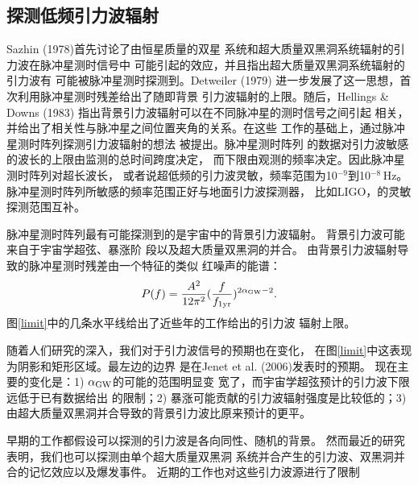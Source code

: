 \subsection{探测低频引力波辐射}

Sazhin (1978)\supercite{saz78}首先讨论了由恒星质量的双星
系统和超大质量双黑洞系统辐射的引力波在脉冲星测时信号中
可能引起的效应，并且指出超大质量双黑洞系统辐射的引力波有
可能被脉冲星测时探测到。Detweiler (1979)\supercite{det79}
进一步发展了这一思想，首次利用脉冲星测时残差给出了随即背景
引力波辐射的上限。随后，Hellings \& Downs (1983)\supercite{hd83}
指出背景引力波辐射可以在不同脉冲星的测时信号之间引起
相关，并给出了相关性与脉冲星之间位置夹角的关系。在这些
工作的基础上，通过脉冲星测时阵列探测引力波辐射的想法
被提出\supercite{Foster90}。脉冲星测时阵列
的数据对引力波敏感的波长的上限由监测的总时间跨度决定，
而下限由观测的频率决定。因此脉冲星测时阵列对超长波长，
或者说超低频的引力波灵敏，频率范围为10$^{-9}$到10$^{-8}$\,Hz。
脉冲星测时阵列所敏感的频率范围正好与地面引力波探测器，
比如LIGO，的灵敏探测范围互补。

脉冲星测时阵列最有可能探测到的是宇宙中的背景引力波辐射。
背景引力波可能来自于宇宙学超弦\supercite{sbs12}、暴涨阶
段\supercite{zhao11}以及超大质量双黑洞的并合\supercite{svc08}。
由背景引力波辐射导致的脉冲星测时残差由一个特征的类似
红噪声的能谱\supercite{hobbs12b}：
\begin{equation}
P(f)=\frac{A^2}{12\pi^2}(\frac{f}{f_{\rm{1yr}}})^{2\alpha_{\rm{GW}}-2}.
\end{equation}
图\ref{limit}中的几条水平线给出了近些年的工作给出的引力波
辐射上限\supercite{jhv+06,vlj+11,dfg+13}。

随着人们研究的深入，我们对于引力波信号的预期也在变化，
在图\ref{limit}中这表现为阴影和矩形区域。最左边的边界
是在Jenet et al. (2006)\supercite{jhv+06}发表时的预期。
现在主要的变化是：1) $\alpha_{\rm{GW}}$的可能的范围明显变
宽了，而宇宙学超弦预计的引力波下限远低于已有数据给出
的限制；2) 暴涨可能贡献的引力波辐射强度是比较低的；3) 
由超大质量双黑洞并合导致的背景引力波比原来预计的更平。

早期的工作都假设可以探测的引力波是各向同性、随机的背景。
然而最近的研究表明，我们也可以探测由单个超大质量双黑洞
系统并合产生的引力波、双黑洞并合的记忆效应以及爆发事件。
近期的工作也对这些引力波源进行了限制\supercite{Wang15,Zhu14}

